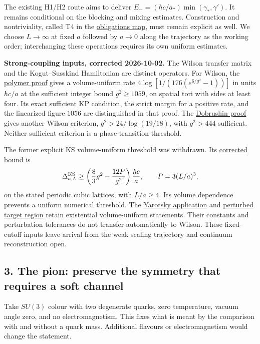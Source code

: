 \documentclass[11pt,a4paper]{article}
\begin{document}
The existing H1/H2 route aims to deliver
\(E_-=(\hbar c/a_*)\min(\gamma_*,\gamma')\). It remains conditional on
the blocking and mixing estimates. Construction and nontriviality,
called T4 in the \href{mass-gap-obligations-lattice.md}{obligations
map}, must remain explicit as well. We choose \(L\to\infty\) at fixed
\(a\) followed by \(a\to0\) along the trajectory as the working order;
interchanging these operations requires its own uniform estimates.

\textbf{Strong-coupling inputs, corrected 2026-10-02.} The Wilson
transfer matrix and the Kogut--Susskind Hamiltonian are distinct
operators. For Wilson, the
\href{wilson-strong-coupling-explicit.md}{polymer proof} gives a
volume-uniform rate \(4\log[1/(176(e^{6/g^2}-1))]\) in units
\(\hbar c/a\) at the sufficient integer bound \(g^2\ge1059\), on spatial
tori with sides at least four. Its exact sufficient KP condition, the
strict margin for a positive rate, and the linearized figure \(1056\)
are distinguished in that proof. The
\href{dobrushin-uniqueness-wilson.md}{Dobrushin proof} gives another
Wilson criterion, \(g^2>24/\log(19/18)\), with \(g^2>444\) sufficient.
Neither sufficient criterion is a phase-transition threshold.

The former explicit KS volume-uniform threshold was withdrawn. Its
\href{kogut-susskind-strong-coupling-explicit.md}{corrected bound} is
\[\Delta_{a,L}^{\rm KS}\ge
\left(\frac83g^2-\frac{12P}{g^2}\right)\frac{\hbar c}{a},
\qquad P=3(L/a)^3,\] on the stated periodic cubic lattices, with
\(L/a\ge4\). Its volume dependence prevents a uniform numerical
threshold. The \href{strong-coupling-uniform-gap.md}{Yarotsky
application} and \href{strong-coupling-target-box.md}{perturbed target
region} retain existential volume-uniform statements. Their constants
and perturbation tolerances do not transfer automatically to Wilson.
These fixed-cutoff inputs leave arrival from the weak scaling trajectory
and continuum reconstruction open.

\hypertarget{the-pion-preserve-the-symmetry-that-requires-a-soft-channel}{%
\subsection{3. The pion: preserve the symmetry that requires a soft
channel}\label{the-pion-preserve-the-symmetry-that-requires-a-soft-channel}}

Take \(SU(3)\) colour with two degenerate quarks, zero temperature,
vacuum angle zero, and no electromagnetism. This fixes what is meant by
the comparison with and without a quark mass. Additional flavours or
electromagnetism would change the statement.
\end{document}
